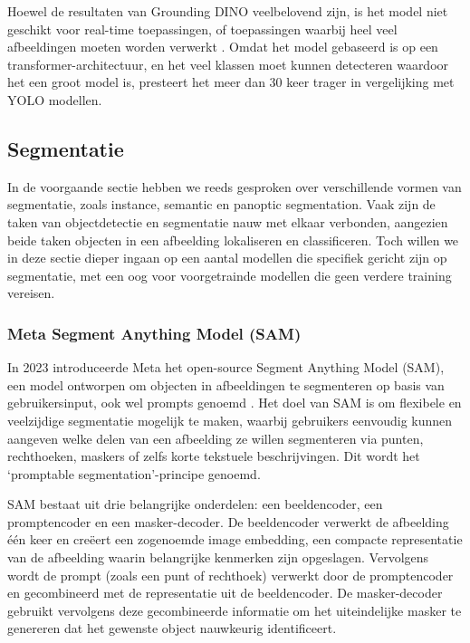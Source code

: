 Hoewel de resultaten van Grounding DINO veelbelovend zijn, is het model niet geschikt voor real-time toepassingen, of toepassingen waarbij heel veel afbeeldingen moeten worden verwerkt \autocite{Son2024}.
Omdat het model gebaseerd is op een transformer-architectuur, en het veel klassen moet kunnen detecteren waardoor het een groot model is, presteert het meer dan 30 keer trager in vergelijking met YOLO modellen.

\subsection{Segmentatie}

In de voorgaande sectie hebben we reeds gesproken over verschillende vormen van segmentatie, zoals instance, semantic en panoptic segmentation.
Vaak zijn de taken van objectdetectie en segmentatie nauw met elkaar verbonden, aangezien beide taken objecten in een afbeelding lokaliseren en classificeren.
Toch willen we in deze sectie dieper ingaan op een aantal modellen die specifiek gericht zijn op segmentatie, met een oog voor voorgetrainde modellen die geen verdere training vereisen.

\subsubsection{Meta Segment Anything Model (SAM)}

In 2023 introduceerde Meta het open-source Segment Anything Model (SAM), een model ontworpen om objecten in afbeeldingen te segmenteren op basis van gebruikersinput, ook wel prompts genoemd \autocite{Kirillov2023}. 
Het doel van SAM is om flexibele en veelzijdige segmentatie mogelijk te maken, waarbij gebruikers eenvoudig kunnen aangeven welke delen van een afbeelding ze willen segmenteren via punten, 
rechthoeken, maskers of zelfs korte tekstuele beschrijvingen. Dit wordt het `promptable segmentation'-principe genoemd.

SAM bestaat uit drie belangrijke onderdelen: een beeldencoder, een promptencoder en een masker-decoder. 
De beeldencoder verwerkt de afbeelding één keer en creëert een zogenoemde image embedding, een compacte representatie van de afbeelding waarin belangrijke kenmerken zijn opgeslagen. 
Vervolgens wordt de prompt (zoals een punt of rechthoek) verwerkt door de promptencoder en gecombineerd met de representatie uit de beeldencoder. 
De masker-decoder gebruikt vervolgens deze gecombineerde informatie om het uiteindelijke masker te genereren dat het gewenste object nauwkeurig identificeert.

